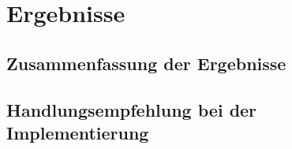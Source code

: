 \newpage
\section{Ergebnisse}
\subsection{Zusammenfassung der Ergebnisse}
\subsection{Handlungsempfehlung bei der Implementierung}